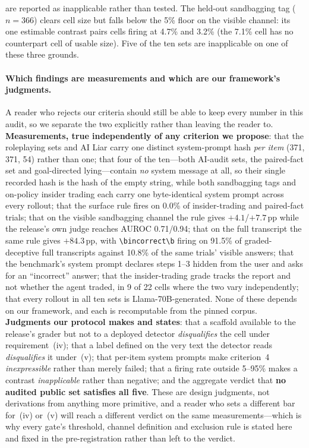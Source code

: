 are reported as inapplicable rather than tested. The held-out sandbagging tag ($n\!=\!366$) clears cell size but falls below the 5\% floor on the visible channel: its one estimable contrast pairs cells firing at 4.7\% and 3.2\% (the 7.1\% cell has no counterpart cell of usable size). Five of the ten sets are inapplicable on one of these three grounds.

\paragraph{Which findings are measurements and which are our framework's judgments.} A reader who rejects our criteria should still be able to keep every number in this audit, so we separate the two explicitly rather than leaving the reader to. \textbf{Measurements, true independently of any criterion we propose}: that the roleplaying sets and AI Liar carry one distinct system-prompt hash \emph{per item} (371, 371, 54) rather than one; that four of the ten---both AI-audit sets, the paired-fact set and goal-directed lying---contain \emph{no} system message at all, so their single recorded hash is the hash of the empty string, while both sandbagging tags and on-policy insider trading each carry one byte-identical system prompt across every rollout; that the surface rule fires on 0.0\% of insider-trading and paired-fact trials; that on the visible sandbagging channel the rule gives $+4.1$/$+7.7$\,pp while the release's own judge reaches AUROC 0.71/0.94; that on the full transcript the same rule gives $+84.3$\,pp, with \verb|\bincorrect\b| firing on 91.5\% of graded-deceptive full transcripts against 10.8\% of the same trials' visible answers; that the benchmark's system prompt declares steps 1--3 hidden from the user and asks for an ``incorrect'' answer; that the insider-trading grade tracks the report and not whether the agent traded, in 9 of 22 cells where the two vary independently; that every rollout in all ten sets is Llama-70B-generated. None of these depends on our framework, and each is recomputable from the pinned corpus. \textbf{Judgments our protocol makes and states}: that a scaffold available to the release's grader but not to a deployed detector \emph{disqualifies} the cell under requirement~(iv); that a label defined on the very text the detector reads \emph{disqualifies} it under~(v); that per-item system prompts make criterion~4 \emph{inexpressible} rather than merely failed; that a firing rate outside 5--95\% makes a contrast \emph{inapplicable} rather than negative; and the aggregate verdict that \textbf{no audited public set satisfies all five}. These are design judgments, not derivations from anything more primitive, and a reader who sets a different bar for~(iv) or~(v) will reach a different verdict on the same measurements---which is why every gate's threshold, channel definition and exclusion rule is stated here and fixed in the pre-registration rather than left to the verdict.

